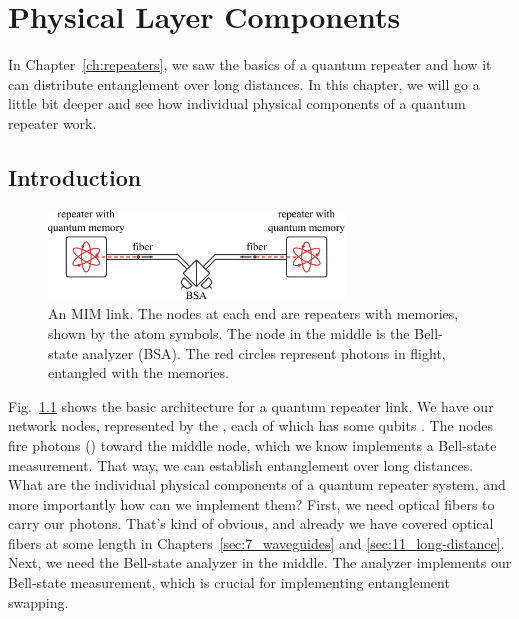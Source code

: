 
\chapter{Physical Layer Components}

In Chapter~\ref{ch:repeaters}, we saw the basics of a quantum repeater and how it can distribute entanglement over long distances. In this chapter, we will go a little bit deeper and see how individual physical components of a quantum repeater work.

\section{Introduction}

\begin{figure}[t]
    \centering
    \includegraphics[width=0.7\textwidth]{lesson13/13-1_repeater.pdf}
    \caption[MIM link hardware]{An MIM link. The nodes at each end are repeaters with memories, shown by the atom symbols.  The node in the middle is the Bell-state analyzer (BSA).  The red circles represent photons in flight, entangled with the memories.}
    \label{fig:13-MIM-link}
\end{figure}


Fig.~\ref{fig:13-MIM-link} shows the basic architecture for a quantum repeater link. We have our network nodes, represented by the , each of which has some qubits .  The nodes fire photons () toward the middle node, which we know implements a Bell-state measurement. That way, we can establish entanglement over long distances. What are the individual physical components of a quantum repeater system, and more importantly how can we implement them? First, we need optical fibers to carry our photons. That's kind of obvious, and already we have covered optical fibers at some length in Chapters~\ref{sec:7_waveguides} and \ref{sec:11_long-distance}. Next, we need the Bell-state analyzer in the middle. The analyzer implements our Bell-state measurement, which is crucial for implementing entanglement swapping.

